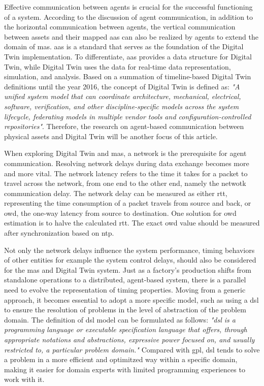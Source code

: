 Effective communication between agents is crucial for the successful functioning of a 
system\cite{georgeff_communication_1988}. According to the discussion of agent 
communication\cite{vogel-heuser_multi-agent_2020}, in addition to the horizontal 
communication between agents, the vertical communication between assets 
and their mapped \gls{aas} can also be realized by agents to extend the domain 
of \gls{mas}. \gls{aas} is a standard 
that serves as the foundation of the Digital Twin implementation\cite{Redeker2021}. 
To differentiate, \gls{aas} provides a data structure for Digital Twin, while Digital 
Twin uses the data for real-time data representation, simulation, and analysis. 
Based on a summation of timeline-based Digital Twin definitions until the year 
2016\cite{negri_review_2017}, the concept of Digital Twin is defined as: \textit{"A 
unified system model that can coordinate architecture, mechanical, electrical, 
software, verification, and other discipline-specific models across the system 
lifecycle, federating models in multiple vendor tools and configuration-controlled 
repositories"}\cite{bajaj_architecture_2016}. Therefore, the research on agent-based 
communication between physical assets and Digital Twin will be another focus of this 
article. 


When exploring Digital Twin and \gls{mas}, a network is the prerequisite for agent communication. 
Resolving network delays during data exchange becomes more and more vital. The network 
latency refers to the time it takes for a packet to travel across the network, from one end 
to the other end, namely the netwotk communication delay. The network delay can be measured 
as either \gls{rtt}, representing the time consumption of a packet travels from source and 
back, or \gls{owd}, the one-way latency from source to 
destination. One solution for \gls{owd} estimation\cite{abdou_accurate_2015} is 
to halve the calculated \gls{rtt}\cite{karn_improving_nodate}. 
The exact \gls{owd} value should be measured after synchronization based on \gls{ntp}\cite{abdou_accurate_2015}. 


Not only the network delays influence the system performance, timing behaviors of other 
entities for example the system control delays, should also be considered for the \gls{mas} and 
Digital Twin system.
Just as a factory's production shifts from standalone operations to a distributed, 
agent-based system, there is a parallel need to evolve the representation of timing 
properties. Moving from a generic approach, it becomes essential to adopt a more 
specific model, such as using a \gls{dsl} to ensure the resolution of problems 
in the level of abstraction of the problem domain. The definition of \gls{dsl} model 
can be formulated as follows: \textit{"\gls{dsl} is a programming language or executable 
specification language
that offers, through appropriate notations and abstractions, expressive power focused 
on, and usually restricted to, a particular problem domain."}\cite{van_deursen_domain-specific_2000}
Compared with \gls{gpl}, \gls{dsl} tends to solve a problem in a more efficient 
and optimitzed way within a specific domain, making it easier for domain experts 
with limited programming experiences to work with it.  

